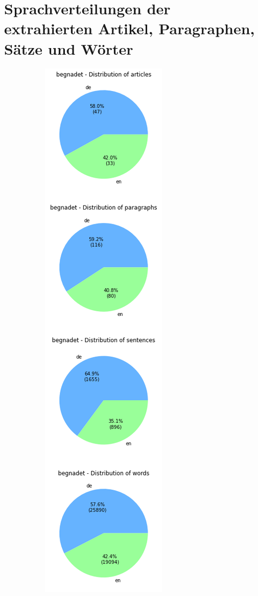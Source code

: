 \documentclass[ngerman]{ttlab-qualify}
\begin{document}
\appendix
\chapter{Sprachverteilungen der extrahierten Artikel, Paragraphen, Sätze und Wörter}
\begin{figure}[htb]
    \centering
    \begin{subfigure}[t]{.45\textwidth}
      \centering
        \includegraphics[width=.7\textwidth]{grafiken/Sprachverteilungen_begnadet_en_de.png}

\end{subfigure}
\end{figure}
\end{document}
